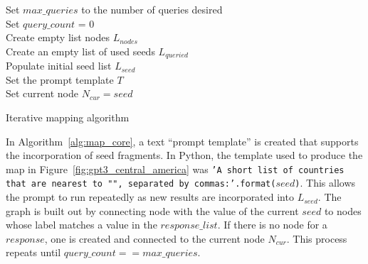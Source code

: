 \documentclass[11pt,dvipdfm]{article}
\begin{document}
\begin{algorithm}
    \small
	Set $max\_queries$ to the number of queries desired \\
	Set $query\_count$ = 0 \\
	Create empty list nodes $L_{nodes}$\\
	Create an empty list of used seeds $L_{queried}$\\
	Populate initial seed list $L_{seed}$\\
	Set the prompt template $T$\\
	Set current node $N_{cur} = seed$\\
	\vspace{0.5em}
	\caption{Iterative mapping algorithm}
	\label{alg:map_core}
\end{algorithm}

In Algorithm~\ref{alg:map_core}, a text \enquote{prompt template} is created that supports the incorporation of seed fragments. In Python, the template used to produce the map in Figure~\ref{fig:gpt3_central_america} was \texttt{'A short list of countries that are nearest to "\string{\string}", separated by commas:'.format($seed$)}. This allows the prompt to run repeatedly as new results are incorporated into $L_{seed}$. The graph is built out by connecting node with the value of the current $seed$ to nodes whose label matches a value in the $response\_list$. If there is no node for a $response$, one is created and connected to the current node $N_{cur}$. This process repeats until $query\_count == max\_queries$.
\end{document}
